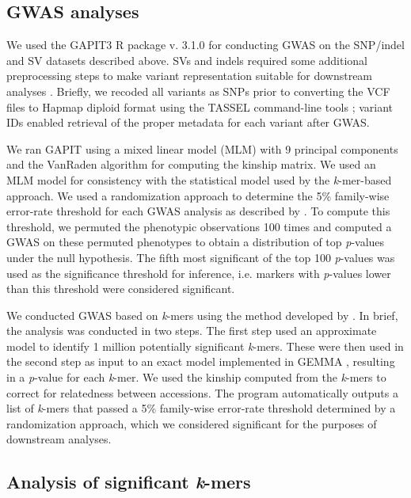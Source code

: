 \documentclass{article}
\begin{document}
\subsection*{GWAS analyses}

We used the GAPIT3 R package v. 3.1.0  for conducting GWAS on
the SNP/indel and SV datasets described above. SVs and indels required some additional
preprocessing steps to make variant
representation suitable for downstream analyses . Briefly, we recoded all
variants as SNPs prior to converting the VCF files to Hapmap diploid format
using the TASSEL command-line tools ; variant IDs enabled
retrieval of the proper metadata for each variant after GWAS.

We ran GAPIT using a mixed linear model (MLM) with 9 principal components and the VanRaden
algorithm for computing the kinship matrix. We used an MLM model for
consistency with the statistical model used by the \textit{k}-mer-based
approach.  We used a randomization approach to determine the 5\% family-wise
error-rate threshold for each GWAS analysis as described by .
To compute this threshold, we permuted the phenotypic observations 100 times
and computed a GWAS on these permuted phenotypes to obtain a distribution of
top \emph{p}-values under the null hypothesis. The fifth most significant of
the top 100 \emph{p}-values was used as the significance threshold for
inference, i.e. markers with \emph{p}-values lower than this threshold were
considered significant.

We conducted GWAS based on \emph{k}-mers using the method developed by
. In brief, the
analysis was conducted in two steps. The first step used an approximate model
to identify 1 million potentially significant \emph{k}-mers. These were then used in
the second step as input to an exact model implemented in GEMMA , resulting
in a \emph{p}-value for each \emph{k}-mer. We
used the kinship computed from the \emph{k}-mers to correct for relatedness
between accessions. The program automatically outputs a list of \emph{k}-mers
that passed a 5\% family-wise error-rate threshold determined by a
randomization approach, which we considered significant for the purposes of
downstream analyses.

\subsection*{Analysis of significant \emph{k}-mers}
\end{document}
